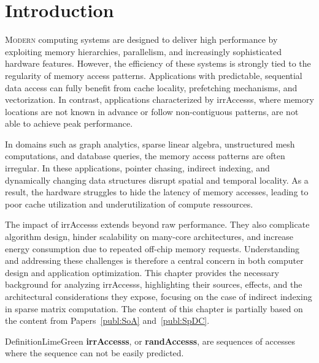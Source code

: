 
\section{Introduction}
\label{sec:bg:intro}

\lettrine{M}{odern} computing systems are designed to deliver high performance by exploiting memory hierarchies, parallelism, and increasingly sophisticated hardware features.
However, the efficiency of these systems is strongly tied to the regularity of memory access patterns.
Applications with predictable, sequential data access can fully benefit from cache locality, prefetching mechanisms, and vectorization.
In contrast, applications characterized by \glspl{irrAccess}, where memory locations are not known in advance or follow non-contiguous patterns, are not able to achieve peak performance.

In domains such as graph analytics, sparse linear algebra, unstructured mesh computations, and database queries, the memory access patterns are often irregular.
In these applications, pointer chasing, indirect indexing, and dynamically changing data structures disrupt spatial and temporal locality.
As a result, the hardware struggles to hide the latency of memory accesses, leading to poor cache utilization and underutilization of compute ressources.

The impact of \glspl{irrAccess} extends beyond raw performance.
They also complicate algorithm design, hinder scalability on many-core architectures, and increase energy consumption due to repeated off-chip memory requests.
Understanding and addressing these challenges is therefore a central concern in both computer design and application optimization.
This chapter provides the necessary background for analyzing \glspl{irrAccess}, highlighting their sources, effects, and the architectural considerations they expose, focusing on the case of indirect indexing in sparse matrix computation.
The content of this chapter is partially based on the content from Papers~\ref{publ:SoA} and~\ref{publ:SpDC}.

\begin{highlight}{Definition}{LimeGreen}
    \textbf{\Glspl{irrAccess}}, or \textbf{\glspl{randAccess}}, are sequences of accesses where the sequence can not be easily predicted.
\end{highlight}